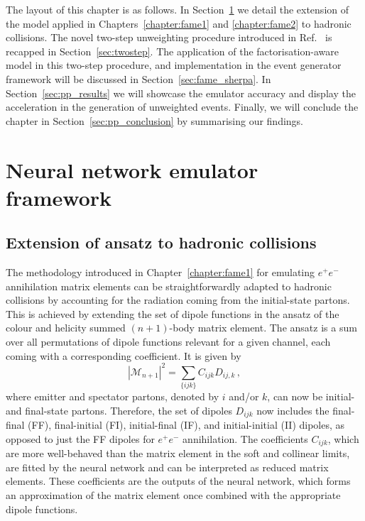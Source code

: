 \documentclass[main.tex]{subfiles}
\begin{document}
The layout of this chapter is as follows. In Section~\ref{sec:pp_dipoles}
we detail the extension of the model applied in Chapters~\ref{chapter:fame1}
and \ref{chapter:fame2} to hadronic collisions. The novel two-step unweighting
procedure introduced in Ref.~\cite{Danziger:2021eeg} is recapped in
Section~\ref{sec:twostep}. The application of the factorisation-aware
model in this two-step procedure, and implementation in the {\Sherpa} event
generator framework will be discussed in Section~\ref{sec:fame_sherpa}.
In Section~\ref{sec:pp_results} we will showcase the emulator accuracy
and display the acceleration in the generation of unweighted events.
Finally, we will conclude the chapter in Section~\ref{sec:pp_conclusion}
by summarising our findings.

\section{Neural network emulator framework}\label{sec:pp_dipoles}
\subsection{Extension of ansatz to hadronic collisions}\label{sec:pp_ansatz}
The methodology introduced in Chapter~\ref{chapter:fame1}
for emulating $e^{+}e^{-}$ annihilation matrix elements can be straightforwardly
adapted to hadronic collisions by accounting for the radiation
coming from the initial-state partons. This is achieved by extending
the set of dipole functions in the ansatz of the colour
and helicity summed $(n+1)$-body matrix element. The ansatz
is a sum over all permutations of dipole functions relevant
for a given channel, each coming with a corresponding coefficient.
It is given by
\begin{equation}
    |\mathcal{M}_{n+1}|^{2} = \sum_{\{ijk\}} C_{ijk}D_{ij,k} \, ,
    \label{eqn:pp_ansatz}
\end{equation}
where emitter and spectator partons, denoted by $i$ and/or $k$,
can now be initial- and final-state partons.
Therefore, the set of dipoles $D_{ijk}$ now includes the final-final (FF),
final-initial (FI), initial-final (IF), and initial-initial (II) dipoles,
as opposed to just the FF dipoles for $e^{+}e^{-}$ annihilation.
The coefficients $C_{ijk}$, which are more well-behaved than
the matrix element in the soft and collinear limits, are
fitted by the neural network and can be interpreted as reduced matrix
elements. These coefficients are the outputs of the neural network,
which forms an approximation of the matrix element once combined with
the appropriate dipole functions.
\end{document}
